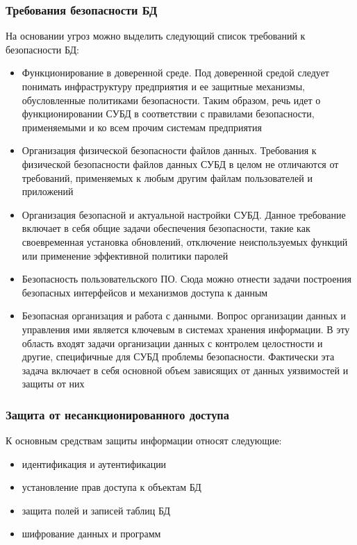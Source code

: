 \subsubsection{Требования безопасности БД}
На основании угроз можно выделить следующий список требований к безопасности БД:
\begin{itemize}
	\item Функционирование в доверенной среде. Под доверенной средой следует понимать инфраструктуру предприятия и ее защитные механизмы, обусловленные политиками безопасности. Таким образом, речь идет о функционировании СУБД в соответствии с правилами безопасности, применяемыми и ко всем прочим системам предприятия
	
	\item Организация физической безопасности файлов данных. Требования к физической безопасности файлов данных СУБД в целом не отличаются от требований, применяемых к любым другим файлам пользователей и приложений
	
	\item Организация безопасной и актуальной настройки СУБД. Данное требование включает в себя общие задачи обеспечения безопасности, такие как своевременная установка обновлений, отключение неиспользуемых функций или применение эффективной политики паролей
	
	\item Безопасность пользовательского ПО. Сюда можно отнести задачи построения безопасных интерфейсов и механизмов доступа к данным
	
	\item Безопасная организация и работа с данными. Вопрос организации данных и управления ими является ключевым в системах хранения информации. В эту область входят задачи организации данных с контролем целостности и другие, специфичные для СУБД проблемы безопасности. Фактически эта задача включает в себя основной объем зависящих от данных уязвимостей и защиты от них
\end{itemize}

\subsubsection{Защита от несанкционированного доступа}
К основным средствам защиты информации относят следующие:
\begin{itemize}
	\item идентификация и аутентификации
	\item установление прав доступа к объектам БД
	\item защита полей и записей таблиц БД
	\item шифрование данных и программ
\end{itemize}

